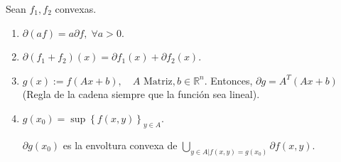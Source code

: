 \begin{paracol}{2}
\begin{prop}\; Sean $f_1,f_2$ convexas.
    \begin{enumerate}[1.]
	\item $\partial (af) = a\partial f,\; \forall a>0$.
	\item $\partial(f_1+f_2)(x) = \partial f_1(x) + \partial f_2(x)$.
	\item $g(x):=f(Ax+b),\quad A \text{ Matriz}, b\in \mathbb{R}^n$. Entonces, $\partial g = A^T(Ax+b)$ (Regla de la cadena siempre que la función sea lineal). 
	\item $g(x_0)=\sup \left\{f(x,y)\right\}_{y\in A}$.

	$\partial g(x_0)$ es la envoltura convexa de $\displaystyle\bigcup_{y\in A | f(x,y)=g(x_0)}\partial f(x,y)$.
    \end{enumerate}
\end{prop}


\end{paracol}
